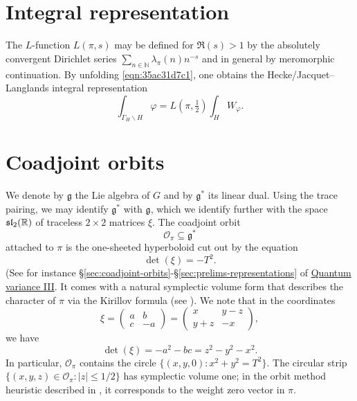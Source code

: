 \documentclass[reqno]{amsart} 
\numberwithin{equation}{section}
\numberwithin{theorem}{section}
\begin{document}
\section{Integral representation}\label{sec:org8f5cc20}
The $L$-function $L(\pi,s)$ may be defined for $\Re(s) > 1$ by the absolutely convergent Dirichlet series $\sum_{n \in \mathbb{N} } \lambda_\pi(n) n^{-s}$ and in general by meromorphic continuation.  By unfolding \eqref{eqn:35ac31d7c1}, one obtains the Hecke/Jacquet--Langlands integral representation
\begin{equation}\label{eq:int-_h-varphi}
  \int _{\Gamma_{H} \backslash H} \varphi = L(\pi,\tfrac{1}{2}) \int _H W_\varphi.
\end{equation}


\section{Coadjoint orbits}\label{sec:orge4ffe7c}
We denote by $\mathfrak{g}$ the Lie algebra of $G$ and by $\mathfrak{g}^*$ its linear dual.  Using the trace pairing, we may identify $\mathfrak{g}^*$ with $\mathfrak{g}$, which we identify further with the space $\operatorname{\mathfrak{s}\mathfrak{l}}_2(\mathbb{R})$ of traceless $2 \times 2$ matrices $\xi$.  The coadjoint orbit
\begin{equation*}
  \mathcal{O}_\pi \subseteq \mathfrak{g}^*
\end{equation*}
attached to $\pi$ is the one-sheeted hyperboloid cut out by the equation
\begin{equation*}
  \det(\xi) = -T^2.
\end{equation*}
(See for instance \S\ref{sec:coadjoint-orbits}-\S\ref{sec:prelims-representations} of \href{var-quat-3-submitted.pdf}{Quantum variance III}. It comes with a natural symplectic volume form that describes the character of $\pi$ via the Kirillov formula (see \cite[\S6]{nelson-venkatesh-1}).  We note that in the coordinates
\begin{equation*}
  \xi =
  \begin{pmatrix}
    a & b \\
    c & -a
  \end{pmatrix}
  =
  \begin{pmatrix}
  x & y - z \\
  y + z & -x
\end{pmatrix},
\end{equation*}
we have
\begin{equation*}
  \det(\xi) = -a^2 - b c = z^2 - y^2 - x^2.
\end{equation*}
In particular, $\mathcal{O}_\pi$ contains the circle $\{(x,y,0) : x^2 + y^2 = T^2\}$.  The circular strip $\{(x,y,z) \in \mathcal{O}_\pi : |z| \leq 1/2\}$ has symplectic volume one; in the orbit method heuristic described in \cite[\S1.7]{nelson-venkatesh-1}, it corresponds to the weight zero vector in $\pi$.
\end{document}
